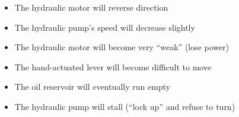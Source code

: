 \begin{itemize}
\item{} The hydraulic motor will reverse direction
\vskip 5pt 
\item{} The hydraulic pump's speed will decrease slightly
\vskip 5pt 
\item{} The hydraulic motor will become very ``weak'' (lose power) 
\vskip 5pt 
\item{} The hand-actuated lever will become difficult to move
\vskip 5pt 
\item{} The oil reservoir will eventually run empty 
\vskip 5pt 
\item{} The hydraulic pump will stall (``lock up'' and refuse to turn)
\end{itemize}





